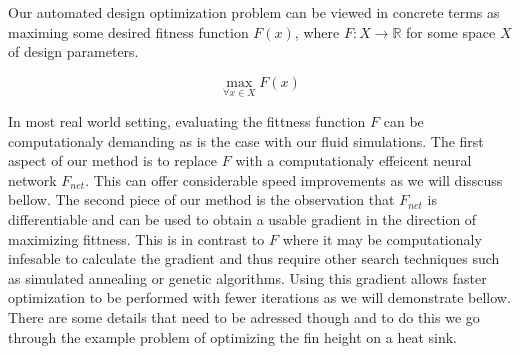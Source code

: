 \documentclass{article} %
\begin{document}
Our automated design optimization problem can be viewed in concrete terms as maximing some desired fitness function $F(x)$, where $F:X \rightarrow \mathbb{R}$ for some space $X$ of design parameters.

\begin{equation}
  \max_{\forall x \in X} F(x)
\end{equation}

In most real world setting, evaluating the fittness function $F$ can be computationaly demanding as is the case with our fluid simulations. The first aspect of our method is to replace $F$ with a computationaly effeicent neural network $F_{net}$. This can offer considerable speed improvements as we will disscuss bellow. The second piece of our method is the observation that $F_{net}$ is differentiable and can be used to obtain a usable gradient in the direction of maximizing fittness. This is in contrast to $F$ where it may be computationaly infesable to calculate the gradient and thus require other search techniques such as simulated annealing or genetic algorithms. Using this gradient allows faster optimization to be performed with fewer iterations as we will demonstrate bellow. There are some details that need to be adressed though and to do this we go through the example problem of optimizing the fin height on a heat sink.
\end{document}
